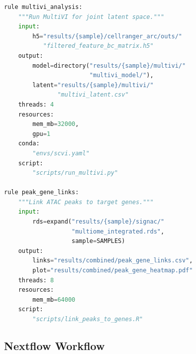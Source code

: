 \begin{lstlisting}[language=Python, caption={Snakemake workflow for 10x Multiome processing.}, label={lst:multiomics:snakemake}]
rule multivi_analysis:
    """Run MultiVI for joint latent space."""
    input:
        h5="results/{sample}/cellranger_arc/outs/"
           "filtered_feature_bc_matrix.h5"
    output:
        model=directory("results/{sample}/multivi/"
                        "multivi_model/"),
        latent="results/{sample}/multivi/"
               "multivi_latent.csv"
    threads: 4
    resources:
        mem_mb=32000,
        gpu=1
    conda:
        "envs/scvi.yaml"
    script:
        "scripts/run_multivi.py"

rule peak_gene_links:
    """Link ATAC peaks to target genes."""
    input:
        rds=expand("results/{sample}/signac/"
                   "multiome_integrated.rds",
                   sample=SAMPLES)
    output:
        links="results/combined/peak_gene_links.csv",
        plot="results/combined/peak_gene_heatmap.pdf"
    threads: 8
    resources:
        mem_mb=64000
    script:
        "scripts/link_peaks_to_genes.R"
\end{lstlisting}

\subsection{Nextflow Workflow}
\label{subsec:multiomics:nextflow}

